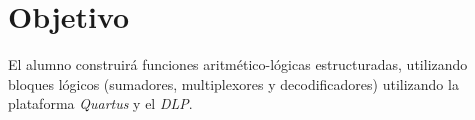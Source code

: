 \documentclass[../main.tex]{subfiles}
\begin{document}
\section{Objetivo}
El alumno construirá funciones aritmético-lógicas estructuradas, utilizando
bloques lógicos (sumadores, multiplexores y decodificadores) utilizando la
plataforma \textit{Quartus} y el \textit{DLP}.
\end{document}
